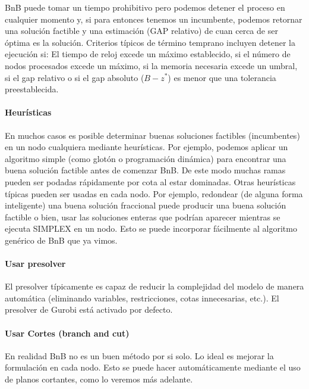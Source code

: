     BnB puede tomar un tiempo prohibitivo pero podemos detener el proceso en cualquier momento y, si para entonces tenemos un incumbente, podemos retornar una solución factible y una estimación (GAP relativo) de cuan cerca de ser óptima es la solución. Criterios típicos de término temprano incluyen detener la ejecución si:
    El tiempo de reloj excede un máximo establecido, si el número de nodos procesados excede un máximo, si la memoria necesaria excede un umbral, si el gap relativo o si el gap absoluto ($B - z^*$) es menor que una tolerancia preestablecida.
    
    \paragraph{Heurísticas}
    En muchos casos es posible determinar buenas soluciones factibles (incumbentes) en un nodo cualquiera mediante heurísticas. Por ejemplo, podemos aplicar un algoritmo simple (como glotón o programación dinámica) para encontrar una buena solución factible antes de comenzar BnB. De este modo muchas ramas pueden ser podadas rápidamente por cota al estar dominadas. Otras heurísticas típicas pueden ser usadas en cada nodo. Por ejemplo, redondear (de alguna forma inteligente) una buena solución fraccional puede producir una buena solución factible o bien, usar las soluciones enteras que podrían aparecer mientras se ejecuta SIMPLEX en un nodo. Esto se puede incorporar fácilmente al algoritmo genérico de BnB que ya vimos.
    
    \paragraph{Usar presolver}
    
    El presolver típicamente es capaz de reducir la complejidad del modelo de manera automática (eliminando variables, restricciones, cotas innecesarias, etc.). El presolver de Gurobi está activado por defecto.
    
	\paragraph{Usar Cortes (branch and cut)}
    
    En realidad BnB no es un buen método por si solo. Lo ideal es mejorar la formulación en cada nodo. Esto se puede hacer automáticamente mediante el uso de planos cortantes, como lo veremos más adelante.
    



